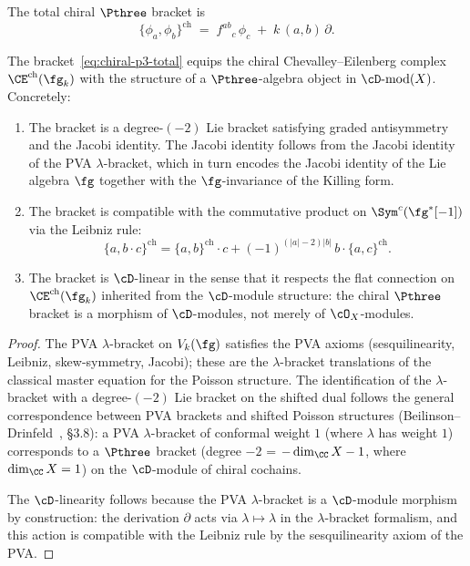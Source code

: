\begin{construction}
The total chiral $\Pthree$ bracket is
\begin{equation}\label{eq:chiral-p3-total}
  \{\phi_a, \phi_b\}^{\mathrm{ch}}
  \;=\;
  f^{ab}{}_c\,\phi_c
  \;+\;
  k\,(a,b)\,\partial.
\end{equation}
\end{construction}

\begin{proposition}
\label{prop:chiral-p3-structure}
The bracket~\eqref{eq:chiral-p3-total} equips the chiral
Chevalley--Eilenberg complex $\CE^{\mathrm{ch}}(\fg_k)$
with the structure of a $\Pthree$-algebra object in
$\cD\textrm{-}\mathrm{mod}(X)$. Concretely:
\begin{enumerate}[label=\textup{(\roman*)}]
\item The bracket is a degree-$(-2)$ Lie bracket satisfying
  graded antisymmetry and the Jacobi identity.
  The Jacobi identity follows from the Jacobi identity of the
  PVA $\lambda$-bracket, which in turn encodes the Jacobi
  identity of the Lie algebra $\fg$ together with the
  $\fg$-invariance of the Killing form.
\item The bracket is compatible with the commutative product
  on $\Sym^c(\fg^*[-1])$ via the Leibniz rule:
  \[
    \{a, b \cdot c\}^{\mathrm{ch}}
    = \{a, b\}^{\mathrm{ch}} \cdot c
    + (-1)^{(|a|-2)|b|}\, b \cdot \{a, c\}^{\mathrm{ch}}.
  \]
\item The bracket is $\cD$-linear in the sense that it
  respects the flat connection on
  $\CE^{\mathrm{ch}}(\fg_k)$ inherited from the
  $\cD$-module structure: the chiral $\Pthree$ bracket
  is a morphism of $\cD$-modules, not merely of
  $\cO_X$-modules.
\end{enumerate}
\end{proposition}

\begin{proof}
The PVA $\lambda$-bracket on $V_k(\fg)$ satisfies the PVA
axioms (sesquilinearity, Leibniz, skew-symmetry, Jacobi);
these are the $\lambda$-bracket translations of the classical
master equation for the Poisson structure.
The identification of the $\lambda$-bracket with a
degree-$(-2)$ Lie bracket on the shifted dual follows the
general correspondence between PVA brackets and shifted
Poisson structures (Beilinson--Drinfeld~\cite{BD04},
\S3.8): a PVA $\lambda$-bracket of conformal weight $1$
(where $\lambda$ has weight $1$) corresponds to a
$\Pthree$ bracket (degree $-2$ = $-\dim_\CC X - 1$, where
$\dim_\CC X = 1$) on the $\cD$-module of chiral cochains.

The $\cD$-linearity follows because the PVA
$\lambda$-bracket is a $\cD$-module morphism by construction:
the derivation $\partial$ acts via $\lambda \mapsto \lambda$
in the $\lambda$-bracket formalism, and this action is
compatible with the Leibniz rule by the sesquilinearity
axiom of the PVA.
\end{proof}


